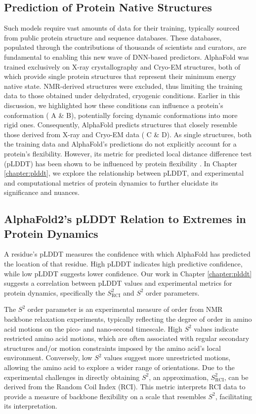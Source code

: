 \subsection{Prediction of Protein Native Structures}

Such models require vast amounts of data for their training, typically sourced from public protein structure and sequence databases. These databases, populated through the contributions of thousands of scientists and curators, are fundamental to enabling this new wave of DNN-based predictors. AlphaFold was trained exclusively on X-ray crystallography and Cryo-EM structures, both of which provide single protein structures that represent their minimum energy native state. NMR-derived structures were excluded, thus limiting the training data to those obtained under dehydrated, cryogenic conditions. Earlier in this discussion, we highlighted how these conditions can influence a protein's conformation ( A \& B), potentially forcing dynamic conformations into more rigid ones. Consequently, AlphaFold predicts structures that closely resemble those derived from X-ray and Cryo-EM data ( C \& D). As single structures, both the training data and AlphaFold's predictions do not explicitly account for a protein's flexibility. However, its metric for predicted local distance difference test (pLDDT) has been shown to be influenced by protein flexibility \cite{saldano_impact_2022}. In Chapter \ref{chapter:plddt}, we explore the relationship between pLDDT, and experimental and computational metrics of protein \gls{dynamics} to further elucidate its significance and nuances.


\subsection{AlphaFold2's pLDDT Relation to Extremes in Protein Dynamics}

A residue's pLDDT measures the confidence with which AlphaFold has predicted the location of that residue. High pLDDT indicates high predictive confidence, while low pLDDT suggests lower confidence. Our work in Chapter \ref{chapter:plddt} \cite{gavalda-garcia_gradations_2024} suggests a correlation between pLDDT values and experimental metrics for protein \gls{dynamics}, specifically the $S^{2}_{\text{RCI}}$ and $S^{2}$ order parameters.

The $S^{2}$ order parameter is an experimental measure of order from NMR backbone relaxation experiments, typically reflecting the degree of order in amino acid motions on the pico- and nano-second timescale. High $S^{2}$ values indicate restricted amino acid motions, which are often associated with regular secondary structures and/or motion constraints imposed by the amino acid's local environment. Conversely, low $S^{2}$ values suggest more unrestricted motions, allowing the amino acid to explore a wider range of orientations. Due to the experimental challenges in directly obtaining $S^{2}$, an approximation, $S^{2}_{\text{RCI}}$, can be derived from the Random Coil Index (RCI). This metric interprets RCI data to provide a measure of backbone flexibility on a scale that resembles $S^{2}$, facilitating its interpretation.

